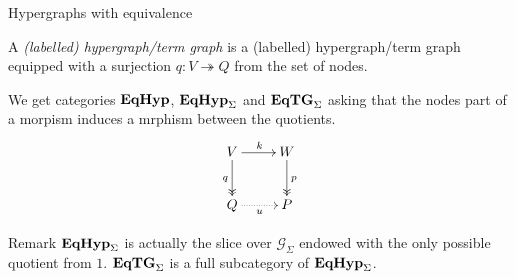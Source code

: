 \documentclass{beamer}
\newcommand{\catname}[1]{\textbf{\textup{#1}}}
\newcommand{\EqHyp}{\catname{EqHyp}} %
\newcommand{\EqHyps}{\catname{EqHyp}_{\Sigma}}
\newcommand{\EqTG}{\catname{EqTG}}
\newcommand{\eto}{\twoheadrightarrow}
\begin{document}
\begin{frame}{Hypergraphs with equivalence}

A \emph{(labelled) hypergraph/term graph} is a (labelled) hypergraph/term graph equipped with a surjection $q\colon V\eto Q$ from the set of nodes. \pause 

We get categories $\EqHyp$, $\EqHyps$ and  $\EqTG_{\Sigma}$ asking that the nodes part of a morpism induces a mrphism between the quotients. 
\[\xymatrix{V \ar@{>>}[d]_{q} \ar[r]^{k}& W \ar@{>>}[d]^p\\ Q \ar@{.>}[r]_{u} & P }\]

\pause 

\begin{block}{Remark}\justifying
$\EqHyps$ is actually the slice over $\mathcal{G}_\Sigma$ endowed with the only possible quotient from $1$. $ \EqTG_{\Sigma}$ is a full subcategory of $\EqHyps$.
\end{block}
\end{frame}
\end{document}
